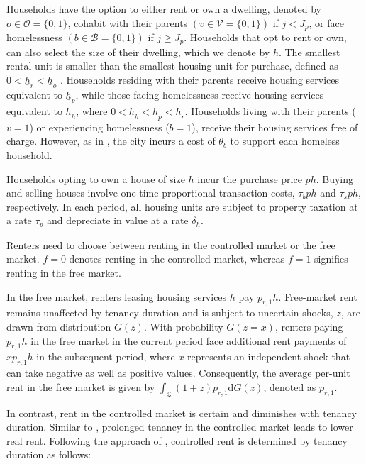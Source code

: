 \documentclass[parskip=full]{article}
\begin{document}
Households have the option to either rent or own a dwelling, denoted by $o \in \mathcal{O}=\{0,1\}$, cohabit with their parents $\left(v \in \mathcal{V}=\{0,1\}\right)$ if $j<J_{p}$, or face homelessness $\left(b \in \mathcal{B}=\{0,1\}\right)$ if $j \geq J_{p}$. Households that opt to rent or own, can also select the size of their dwelling, which we denote by $h$. The smallest rental unit is smaller than the smallest housing unit for purchase, defined as $0<\underline{h}_{r}<\underline{h}_{o}$ \citep{gervais,sommeretal-2013,sommersullivan-2017,kaplanetal-2019}. Households residing with their parents receive housing services equivalent to $\underline{h}_{p}$, while those facing homelessness receive housing services equivalent to $\underline{h}_{h}$, where $0<\underline{h}_{h}<\underline{h}_{p}<\underline{h}_{r}$. Households living with their parents ($v=1$) or experiencing homelessness ($b=1$), receive their housing services free of charge. However, as in \citet{abramson-2024}, the city incurs a cost of $\theta_{b}$ to support each homeless household.

Households opting to own a house of size $h$ incur the purchase price $p h$. Buying and selling houses involve one-time proportional transaction costs, $\tau_{b} p h$ and $\tau_{s} p h$, respectively. In each period, all housing units are subject to property taxation at a rate $\tau_{p}$ and depreciate in value at a rate $\delta_h$.

Renters need to choose between renting in the controlled market or the free market. $f=0$ denotes renting in the controlled market, whereas $f=1$ signifies renting in the free market.

In the free market, renters leasing housing services $h$ pay $p_{r,1} h$. Free-market rent remains unaffected by tenancy duration and is subject to uncertain shocks, $z$, are drawn from distribution $G(z)$. With probability $G(z=x)$, renters paying $p_{r,1}h$ in the free market in the current period face additional rent payments of $x p_{r,1}h$ in the subsequent period, where $x$ represents an independent shock that can take negative as well as positive values. Consequently, the average per-unit rent in the free market is given by $\int_\mathcal{Z}(1+z)p_{r,1}\mathrm{d}G(z)$, denoted as $\overline{p}_{r,1}$.

In contrast, rent in the controlled market is certain and diminishes with tenancy duration. Similar to \citet{fmn-2023}, prolonged tenancy in the controlled market leads to lower real rent. Following the approach of \citet{fmn-2023}, controlled rent is determined by tenancy duration as follows:
\end{document}
